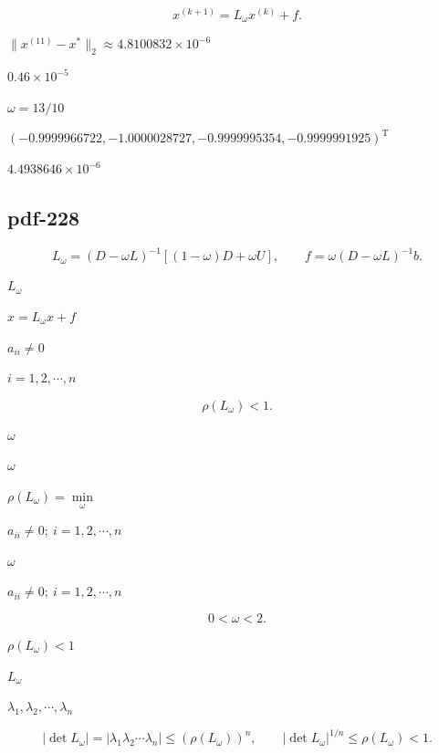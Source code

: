 \documentclass[UTF8,fontset=fandol]{ctexart}
\begin{document}
\[
x^{(k+1)}=L_\omega x^{(k)}+f.
\tag{8.4.8}
\]

$\|x^{(11)}-x^*\|_2\approx4.8100832\times10^{-6}$\par

$0.46\times10^{-5}$\par

$\omega=13/10$\par

$(-0.9999966722,-1.0000028727,-0.9999995354,-0.9999991925)^{\mathrm T}$\par

$4.4938646\times10^{-6}$\par

\subsection*{pdf-228}

\[
L_\omega=(D-\omega L)^{-1}[(1-\omega)D+\omega U],\qquad f=\omega(D-\omega L)^{-1}b.
\]

$L_\omega$\par

$x=L_\omega x+f$\par

$a_{ii}\neq0$\par

$i=1,2,\cdots,n$\par

\[
\rho(L_\omega)<1.
\]

$\omega$\par

$\omega$\par

$\rho(L_\omega)=\min\limits_\omega$\par

$a_{ii}\neq0;\ i=1,2,\cdots,n$\par

$\omega$\par

$a_{ii}\neq0;\ i=1,2,\cdots,n$\par

\[
0<\omega<2.
\]

$\rho(L_\omega)<1$\par

$L_\omega$\par

$\lambda_1,\lambda_2,\cdots,\lambda_n$\par

\[
|\det L_\omega|=|\lambda_1\lambda_2\cdots\lambda_n|\leqslant(\rho(L_\omega))^n,\qquad
|\det L_\omega|^{1/n}\leqslant\rho(L_\omega)<1.
\]
\end{document}
